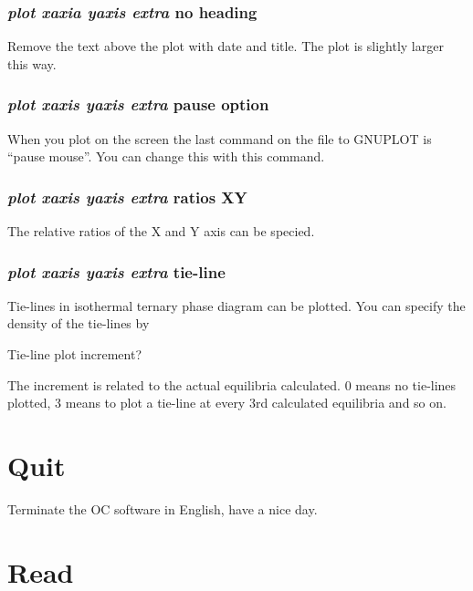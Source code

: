 \documentclass[11pt]{article}
\begin{document}
\subsubsection{{\em plot xaxia yaxis extra} no heading}

Remove the text above the plot with date and title.  The plot is
slightly larger this way.

\hypertarget{Plot pause}{}
\subsubsection{{\em plot xaxis yaxis extra} pause option}

When you plot on the screen the last command on the file to GNUPLOT
is ``pause mouse''.  You can change this with this command.

\hypertarget{Plot ratios}{}
\subsubsection{{\em plot xaxis yaxis extra} ratios XY}

The relative ratios of the X and Y axis can be specied.

\hypertarget{Plot tieline}{}
\subsubsection{{\em plot xaxis yaxis extra} tie-line}

Tie-lines in isothermal ternary phase diagram can be plotted.  You
can specify the density of the tie-lines by

Tie-line plot increment?

The increment is related to the actual equilibria calculated.  0 means
no tie-lines plotted, 3 means to plot a tie-line at every 3rd
calculated equilibria and so on.

\hypertarget{Quit}{}
\section{Quit }

Terminate the OC software in English, have a nice day.

\hypertarget{Read}{}
\section{Read }
\end{document}
